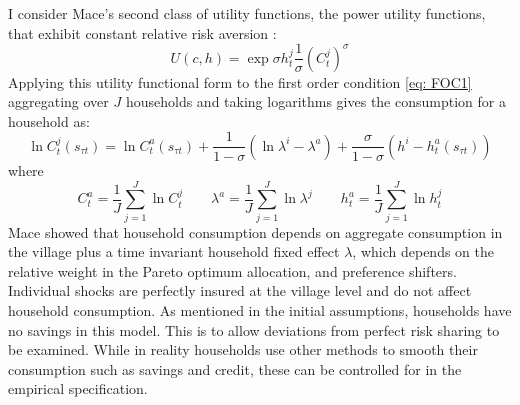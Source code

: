 I consider Mace's second class of utility functions, the power utility functions, that exhibit constant relative risk aversion \citep{Chiappori2011}: 
\begin{equation}
U(c,h)= \exp{\sigma h^j_t}\frac{1}{\sigma}(C^j_t)^{\sigma}
\end{equation}
Applying this utility functional form to the first order condition \eqref{eq: FOC1} aggregating over $J$ households and taking logarithms gives the consumption for a household as:
\begin{equation} \label{eq: consumption}
\ln C_t^j(s_{\tau t}) = \ln C^a_t(s_{\tau t}) + \frac{1}{1-\sigma}(\ln \lambda^i- \lambda^a) + \frac{\sigma}{1-\sigma}(h^i- h^a_t(s_{\tau t}))
\end{equation}
where
\[
C_t^a=\frac{1}{J} \sum_{j=1}^J \ln C_t^j \qquad \lambda^a=\frac{1}{J} \sum_{j=1}^J \ln \lambda^j \qquad  h^a_t=\frac{1}{J} \sum_{j=1}^J \ln h_t^j
\]
Mace showed that household consumption depends on aggregate consumption in the village plus a time invariant household fixed effect $\lambda$, which depends on the relative weight in the Pareto optimum allocation, and preference shifters. Individual shocks are perfectly insured at the village level and do not affect household consumption. As mentioned in the initial assumptions, households have no savings in this model. This is to allow deviations from perfect risk sharing to be examined. While in reality households use other methods to smooth their consumption such as savings and credit, these can be controlled for in the empirical specification. 


